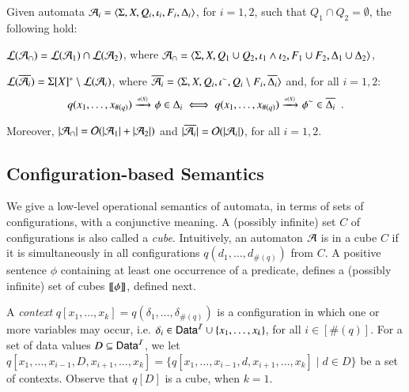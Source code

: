 \documentclass{llncs}
\begin{document}
\begin{theorem}\label{thm:closure}
  Given automata $\mathcal{A}_i = \langle \Sigma,X,Q_i,\iota_i,F_i,\Delta_i \rangle$,
  for $i=1,2$, such that $Q_1 \cap Q_2 = \emptyset$, the following hold: 
  \begin{compactitem}
    \item\label{it1:closure} ${\mathcal L}({\mathcal{A}_\cap}) = {\mathcal L}({\mathcal{A}_1}) \cap {\mathcal L}({\mathcal{A}_2})$, where
      $\mathcal{A}_\cap = \langle \Sigma,X,Q_1 \cup Q_2, \iota_1 \wedge \iota_2,
      F_1 \cup F_2, \Delta_1 \cup \Delta_2 \rangle$, 
    \item\label{it2:closure} ${\mathcal L}({\overline{\mathcal{A}_i}}) = \Sigma[X]^* \setminus
      {\mathcal L}({\mathcal{A}_i})$, where $\overline{\mathcal{A}_i} =
      \langle \Sigma,X,Q_i,{\iota}^{\sim},Q_i\setminus
        F_i,\overline{\Delta_i} \rangle$ and, for all
      $i=1,2$: \[q(x_1,\ldots,x_{\#(q)}) \xrightarrow{{\scriptscriptstyle a(X)}}_{{\scriptstyle }} \phi \in
      \Delta_i \iff q(x_1,\ldots,x_{\#(q)}) \xrightarrow{{\scriptscriptstyle a(X)}}_{{\scriptstyle }} {\phi}^{\sim}
      \in \overline{\Delta_i} \enspace.\]
  \end{compactitem}
  Moreover, ${|{\mathcal{A}_\cap}|} = \mathcal{O}({{|{\mathcal{A}_1}|}+{|{\mathcal{A}_2}|}})$ and
  ${|{\overline{\mathcal{A}_i}}|} = \mathcal{O}({{|{\mathcal{A}_i}|}})$, for all $i=1,2$.
\end{theorem}
\proof{\qed}

\subsection{Configuration-based Semantics}

We give a low-level operational semantics of automata, in terms of
sets of configurations, with a conjunctive meaning. A (possibly
infinite) set $C$ of configurations is also called a
\emph{cube}. Intuitively, an automaton $\mathcal{A}$ is in a cube $C$ if it is
simultaneously in all configurations $q(d_1, \ldots, d_{\#(q)})$ from
$C$. A positive sentence $\phi$ containing at least one occurrence of
a predicate, defines a (possibly infinite) set of cubes ${\bf [\![} \phi {\bf ]\!]}$,
defined next.

A \emph{context} $q[x_1,\ldots,x_k] = q(\delta_1, \ldots,
\delta_{\#(q)})$ is a configuration in which one or more variables may
occur, i.e. $\delta_i \in \mathsf{Data}^{\mathcal{I}} \cup \{ x_1,\ldots,x_k \}$, for all
$i \in [\#(q)]$. For a set of data values $D \subseteq \mathsf{Data}^{\mathcal{I}}$, we
let $q[x_1,\ldots,x_{i-1},D,x_{i+1}, \ldots, x_k] =
\{q[x_1,\ldots,x_{i-1},d,x_{i+1},\ldots,x_k] \mid d \in D\}$ be a set
of contexts. Observe that $q[D]$ is a cube, when $k=1$.

 

\end{document}
